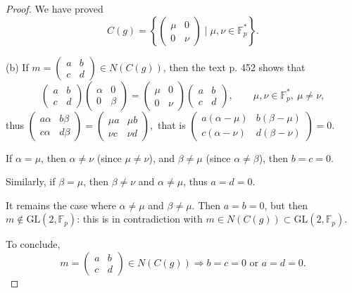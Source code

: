 \documentclass[11pt,a4paper]{article}
\newcommand{\F}{\mathbb{F}}
\begin{document}
{\begin{proof}
We have proved 
$$C(g) = \left\{ \begin{pmatrix} \mu & 0 \\ 0 & \nu \end{pmatrix} \mid \mu,\nu \in \F_p^*\right\}.$$
\item[(b)] If $m =  \begin{pmatrix} a & b \\ c & d \end{pmatrix} \in N(C(g))$, then the text p. 452 shows that
$$\begin{pmatrix} a & b \\ c & d \end{pmatrix} \begin{pmatrix} \alpha & 0 \\ 0 & \beta \end{pmatrix} = \begin{pmatrix} \mu & 0 \\ 0 & \nu \end{pmatrix} \begin{pmatrix} a & b \\ c & d \end{pmatrix},\qquad \mu, \nu  \in \F_p^*,\  \mu \ne \nu,$$
thus
$\begin{pmatrix} a\alpha & b\beta \\ c\alpha & d\beta \end{pmatrix}  = \begin{pmatrix} \mu a & \mu b \\ \nu c & \nu d \end{pmatrix},$ that is
$\begin{pmatrix} a(\alpha - \mu) & b(\beta - \mu) \\ c(\alpha - \nu) & d(\beta - \nu) \end{pmatrix}  = 0$.

If $\alpha = \mu$, then $\alpha \ne \nu$ (since $\mu \ne \nu$), and $\beta \ne \mu$ (since $\alpha \ne \beta$), then $b = c = 0$. 

Similarly, if $\beta = \mu$, then $\beta \ne \nu$ and $\alpha \ne \mu$, thus $a= d = 0$.

It remains the case where $\alpha \ne \mu$ and $\beta \ne \mu$. Then $a = b = 0$, but then $m \not \in \mathrm{GL}(2,\F_p)$: this is in contradiction with $m \in N(C(g)) \subset \mathrm{GL}(2,\F_p)$.

To conclude,
$$m =  \begin{pmatrix} a & b \\ c & d \end{pmatrix} \in N(C(g)) \Rightarrow b=c=0 \text{ or } a=d=0.$$


\end{proof}}
\end{document}
